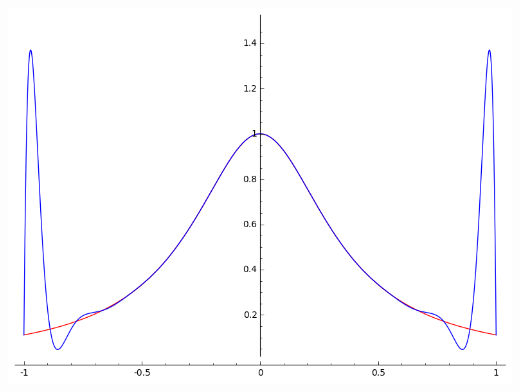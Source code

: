 \documentclass[class=report,crop=false]{standalone}
\begin{document}
\begin{enumerate}
\begin{center}
    \includegraphics[scale=0.22]{figures/runge3}
  \end{center} 
  
\end{enumerate}

\finchapitre
\end{document}
